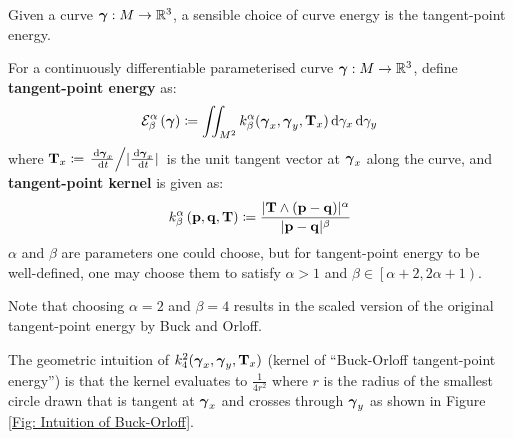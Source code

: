 \documentclass[../dissertation.tex]{subfiles}
\begin{document}
Given a curve $\boldsymbol{\gamma}:M \rightarrow \mathbb{R}^3$,
a sensible choice of curve energy is the tangent-point energy\cite{YSC2021}.
\begin{definition}
    For a continuously differentiable parameterised curve $\boldsymbol{\gamma}:M \rightarrow \mathbb{R}^3$, define \textbf{tangent-point energy} as:
    \begin{equation}
        \mathcal{E}_{\beta}^{\alpha} \left( \boldsymbol{\gamma} \right) \coloneqq \iint_{M^2} k_{\beta}^{\alpha} (\boldsymbol{\gamma}_x, \boldsymbol{\gamma}_y, \mathbf{T}_x) \, \text{d} \gamma_x \, \text{d} \gamma_y 
        \label{equ: Tangent-Point Energy}
    \end{equation}
    where $\mathbf{T}_x \coloneqq \left. \frac{\, \text{d} \boldsymbol{\gamma}_x}{\, \text{d} t} \middle/ \lvert\frac{\, \text{d} \boldsymbol{\gamma}_x}{\, \text{d} t}\lvert \right. $ is the unit tangent vector at $\boldsymbol{\gamma}_x$ along the curve,
    and \textbf{tangent-point kernel} is given as:
    \begin{equation}
        k_{\beta}^{\alpha} \left( \pbf, \qbf, \Tbf \right) \coloneqq \frac{\abs{\Tbf \wedge \left( \pbf - \qbf \right)}^{\alpha}}{\abs{\pbf - \qbf}^{\beta}}
    \end{equation}
    $\alpha$ and $\beta$ are parameters one could choose, but for tangent-point energy to be well-defined,
    one may choose them to satisfy $\alpha >1$ and $\beta \in \left[ \alpha+2, 2\alpha + 1 \right)$.

    Note that choosing $\alpha = 2$ and $\beta = 4$ results in the scaled version of the original tangent-point energy by Buck and Orloff\cite{BO1995}.
\end{definition}
The geometric intuition of $k_{4}^2 (\boldsymbol{\gamma}_x, \boldsymbol{\gamma}_y, \mathbf{T}_x)$ (kernel of ``Buck-Orloff tangent-point energy'') is that the kernel evaluates to $\frac{1}{4r^2}$ where $r$ is the radius of the smallest circle drawn that is tangent at $\boldsymbol{\gamma}_x$ and crosses through $\boldsymbol{\gamma}_y$
as shown in Figure \ref{Fig: Intuition of Buck-Orloff}.
\end{document}
